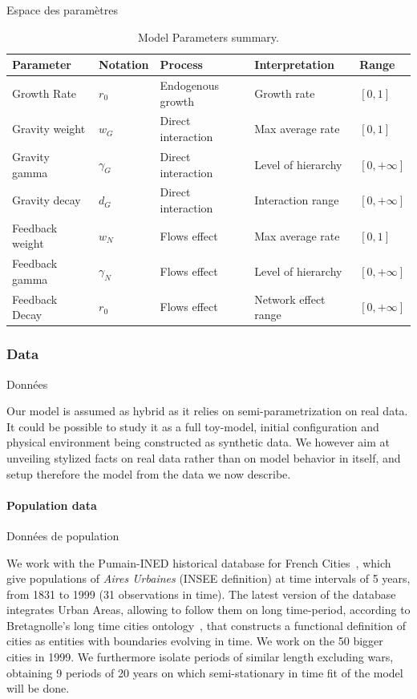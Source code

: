 \begin{table}[ht]
\small\sf\centering
\caption{Model Parameters summary.}{Espace des paramètres}\label{tab:parameters}
\begin{tabular}{|l|l|l|l|l|}
\toprule
Parameter & Notation & Process & Interpretation & Range\\
\midrule
Growth Rate & $r_0$ & Endogenous growth & Growth rate & $\left[ 0,1\right]$ \\
Gravity weight & $w_G$ & Direct interaction & Max average rate & $\left[ 0,1\right]$ \\
Gravity gamma & $\gamma_G$ & Direct interaction & Level of hierarchy & $\left[ 0,+\infty\right]$ \\
Gravity decay & $d_G$ & Direct interaction & Interaction range & $\left[ 0,+\infty\right]$ \\
Feedback weight & $w_N$ & Flows effect & Max average rate & $\left[ 0,1\right]$ \\
Feedback gamma & $\gamma_N$ & Flows effect & Level of hierarchy & $\left[ 0,+\infty\right]$ \\
Feedback Decay & $r_0$ & Flows effect & Network effect range & $\left[ 0,+\infty\right]$ \\
\bottomrule
\end{tabular}
\end{table}




\subsubsection{Data}{Données}


Our model is assumed as hybrid as it relies on semi-parametrization on real data. It could be possible to study it as a full toy-model, initial configuration and physical environment being constructed as synthetic data. We however aim at unveiling stylized facts on real data rather than on model behavior in itself, and setup therefore the model from the data we now describe.

\paragraph{Population data}{Données de population}

We work with the Pumain-INED historical database for French Cities~\citep{pumain1986fichier}, which give populations of \emph{Aires Urbaines} (INSEE definition) at time intervals of 5 years, from 1831 to 1999 (31 observations in time). The latest version of the database integrates Urban Areas, allowing to follow them on long time-period, according to Bretagnolle's long time cities ontology~\citep{bretagnolle:tel-00459720}, that constructs a functional definition of cities as entities with boundaries evolving in time. We work on the 50 bigger cities in 1999. We furthermore isolate periods of similar length excluding wars, obtaining 9 periods of 20 years on which semi-stationary in time fit of the model will be done. 


